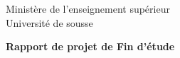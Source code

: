 \documentclass[a4paper,11pt]{report}
\begin{document}

	\begin{titlepage}
		\begin{center}
		{\large Ministère de l'enseignement supérieur } \\
		{\large Université de sousse} \\ 
		\vspace{2cm}
	
		{ \huge \textbf{Rapport de projet de Fin d'étude }}
		\end{center}	
	
	\end{titlepage}



\tableofcontents
\clearpage

\newpage 
\end{document}
